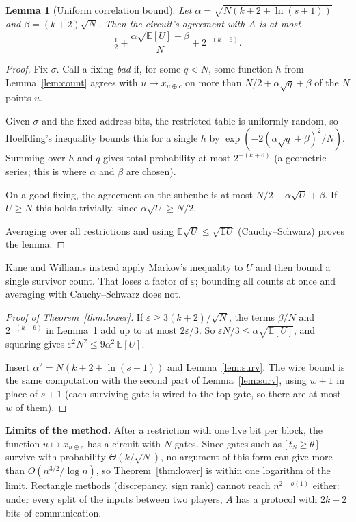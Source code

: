 \documentclass[11pt,letterpaper]{article}
\newtheorem{lemma}{Lemma}
\newcommand{\ind}[1]{\bigl[\,#1\,\bigr]}
\newcommand{\smalltitle}[1]{\textbf{\color{ink}#1}\quad}
\begin{document}
\begin{lemma}[Uniform correlation bound]\label{lem:avg}
Let $\alpha=\sqrt{N(k+2+\ln(s+1))}$ and $\beta=(k+2)\sqrt N$. Then the
circuit's agreement with $A$ is at most
\[
\tfrac12+\frac{\alpha\sqrt{\mathbb E[U]}+\beta}{N}+2^{-(k+6)}.
\]
\end{lemma}
\begin{proof}
Fix $\sigma$. Call a fixing \emph{bad} if, for some $q<N$, some function $h$
from Lemma~\ref{lem:count} agrees with $u\mapsto x_{u\oplus c}$ on more than
$N/2+\alpha\sqrt q+\beta$ of the $N$ points $u$.

Given $\sigma$ and the fixed address bits, the restricted table is uniformly
random, so Hoeffding's inequality bounds this for a single $h$ by
$\exp(-2(\alpha\sqrt q+\beta)^2/N)$. Summing over $h$ and $q$ gives total
probability at most $2^{-(k+6)}$ (a geometric series; this is where
$\alpha$ and $\beta$ are chosen).

On a good fixing, the agreement on the subcube is at most
$N/2+\alpha\sqrt U+\beta$. If $U\ge N$ this holds trivially, since
$\alpha\sqrt U\ge N/2$.

Averaging over all restrictions and using
$\mathbb E\sqrt U\le\sqrt{\mathbb E U}$ (Cauchy--Schwarz) proves the lemma.
\end{proof}
Kane and Williams instead apply Markov's inequality to $U$ and then bound a
single survivor count. That loses a factor of $\varepsilon$; bounding all
counts at once and averaging with Cauchy--Schwarz does not.

\begin{proof}[Proof of Theorem~\ref{thm:lower}]
If $\varepsilon\ge3(k+2)/\sqrt N$, the terms $\beta/N$ and $2^{-(k+6)}$ in
Lemma~\ref{lem:avg} add up to at most $2\varepsilon/3$. So
$\varepsilon N/3\le\alpha\sqrt{\mathbb E[U]}$, and squaring gives
$\varepsilon^2N^2\le9\alpha^2\,\mathbb E[U]$.

Insert $\alpha^2=N(k+2+\ln(s+1))$ and Lemma~\ref{lem:surv}. The
wire bound is the same computation with the second part of
Lemma~\ref{lem:surv}, using $w+1$ in place of $s+1$ (each surviving gate is wired to the top gate, so there are at most $w$ of them).
\end{proof}

\smalltitle{Limits of the method.}
After a restriction with one live bit per block, the function
$u\mapsto x_{u\oplus c}$ has a circuit with $N$ gates. Since gates such as
$\ind{t_S\ge\theta}$ survive with probability $\Theta(k/\sqrt N)$, no argument of this form can give more than
$O(n^{3/2}/\log n)$, so Theorem~\ref{thm:lower} is within one logarithm of
the limit. Rectangle methods (discrepancy, sign rank) cannot reach
$n^{2-o(1)}$ either: under every split of the inputs between two players,
$A$ has a protocol with $2k+2$ bits of communication.
\end{document}
